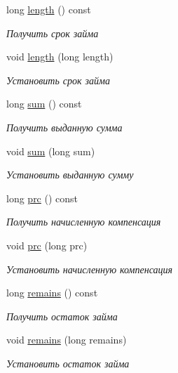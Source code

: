 \begin{DoxyCompactItemize}
long \hyperlink{classkpk_1_1data_1_1_loan_a89c1fd9e63d8923796f0cb3452bafa27}{length} () const 
\begin{DoxyCompactList}\small\item\em Получить срок займа \end{DoxyCompactList}\item 
void \hyperlink{classkpk_1_1data_1_1_loan_af134c522e66faccb01b71c69c801ac6f}{length} (long length)
\begin{DoxyCompactList}\small\item\em Установить срок займа \end{DoxyCompactList}\item 
long \hyperlink{classkpk_1_1data_1_1_loan_a5b207380d82a2079ea83ec1ecf11f090}{sum} () const 
\begin{DoxyCompactList}\small\item\em Получить выданную сумма \end{DoxyCompactList}\item 
void \hyperlink{classkpk_1_1data_1_1_loan_a07ba28ed26a7a422b5c2435dbacd3825}{sum} (long sum)
\begin{DoxyCompactList}\small\item\em Установить выданную сумму \end{DoxyCompactList}\item 
long \hyperlink{classkpk_1_1data_1_1_loan_aabe63b94775011f6c971d8fb7a9cf5b0}{prc} () const 
\begin{DoxyCompactList}\small\item\em Получить начисленную компенсация \end{DoxyCompactList}\item 
void \hyperlink{classkpk_1_1data_1_1_loan_ae7141c53eac6c77d33c9e78eca17427d}{prc} (long prc)
\begin{DoxyCompactList}\small\item\em Установить начисленную компенсация \end{DoxyCompactList}\item 
long \hyperlink{classkpk_1_1data_1_1_loan_a3a85e20cceb9a563153d51fe07f15262}{remains} () const 
\begin{DoxyCompactList}\small\item\em Получить остаток займа \end{DoxyCompactList}\item 
void \hyperlink{classkpk_1_1data_1_1_loan_a242c59d916d1d2dd17d579bfac388e4a}{remains} (long remains)
\begin{DoxyCompactList}\small\item\em Установить остаток займа \end{DoxyCompactList}\item 

\end{DoxyCompactItemize}
